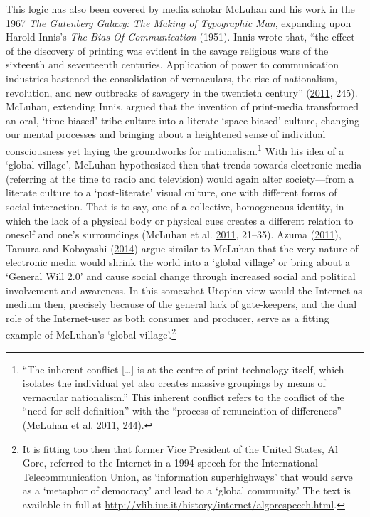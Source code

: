 \documentclass[10pt,british,A4paper,oneside]{memoir}
\begin{document}
This logic has also been covered by media scholar McLuhan and his work
in the 1967 \emph{The Gutenberg Galaxy: The Making of Typographic Man},
expanding upon Harold Innis's \emph{The Bias Of Communication} (1951).
Innis wrote that, ``the effect of the discovery of printing was evident
in the savage religious wars of the sixteenth and seventeenth centuries.
Application of power to communication industries hastened the
consolidation of vernaculars, the rise of nationalism, revolution, and
new outbreaks of savagery in the twentieth century''
(\protect\hyperlink{ref-mcluhan_gutenberg_2011}{2011}, 245). McLuhan,
extending Innis, argued that the invention of print-media transformed an
oral, `time-biased' tribe culture into a literate `space-biased'
culture, changing our mental processes and bringing about a heightened
sense of individual consciousness yet laying the groundworks for
nationalism.\footnote{``The inherent conflict {[}\ldots{}{]} is at the
  centre of print technology itself, which isolates the individual yet
  also creates massive groupings by means of vernacular nationalism.''
  This inherent conflict refers to the conflict of the ``need for
  self-definition'' with the ``process of renunciation of differences''
  (McLuhan et al. \protect\hyperlink{ref-mcluhan_gutenberg_2011}{2011},
  244).} With his idea of a `global village', McLuhan hypothesized then
that trends towards electronic media (referring at the time to radio and
television) would again alter society---from a literate culture to a
`post-literate' visual culture, one with different forms of social
interaction. That is to say, one of a collective, homogeneous identity,
in which the lack of a physical body or physical cues creates a
different relation to oneself and one's surroundings (McLuhan et al.
\protect\hyperlink{ref-mcluhan_gutenberg_2011}{2011}, 21--35).  Azuma (\protect\hyperlink{ref-azuma_ippan_2011}{2011}), Tamura and Kobayashi
(\protect\hyperlink{ref-tamura_niggling_2014}{2014}) argue similar to
McLuhan that the very nature of electronic media would shrink the
world into a `global village' or bring about a `General Will 2.0' and
cause social change through increased social and political involvement
and awareness. In this somewhat Utopian view would the Internet as medium then,
precisely because of the general lack of gate-keepers, and the dual role
of the Internet-user as both consumer and producer, serve as a fitting
example of McLuhan's `global village'.\footnote{It is fitting too
  then that former Vice President of the United States, Al Gore,
  referred to the Internet in a 1994 speech for the International
  Telecommunication Union, as `information superhighways' that would
  serve as a `metaphor of democracy' and lead to a `global community.'
  The text is available in full at
  \url{http://vlib.iue.it/history/internet/algorespeech.html}.}
\end{document}
